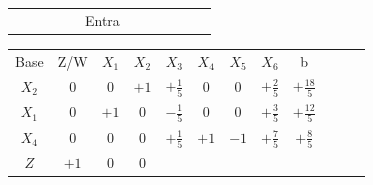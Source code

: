 \documentclass{beamer}
\begin{document}
\begin{frame}
{\begin{table}
\begin{tabular}{c c c c c c c c c c c c}
				& & & & & \scriptsize Entra \\
			\end{tabular}
		\end{table}			
	}	
	{
		\begin{table}		
			\begin{tabular}{c c c c c c c c c c c c}
				\cline{1-8} 
				\cellcolor{blue!100} \color{white} \scriptsize Base 
				&\cellcolor{blue!100} \color{white} \scriptsize Z/W
				&\cellcolor{blue!100} \color{red} $\scriptstyle X_1$ 
				&\cellcolor{blue!100} \color{red} $\scriptstyle X_2$ 
				&\cellcolor{blue!100} \color{white}   $\scriptstyle X_3$ 
				&\cellcolor{blue!100} \color{red} $\scriptstyle X_4$ 
				&\cellcolor{blue!100} \color{white}   $\scriptstyle X_5$ 
				&\cellcolor{blue!100} \color{white}   $\scriptstyle X_6$ 
				&\cellcolor{blue!100} \color{white} \scriptsize b
				&
				&
				& \\
				\cellcolor{blue!100} \color{red} $\scriptstyle X_2$
				& \cellcolor{yellow!50} $\scriptstyle 0$
				& \cellcolor{yellow!50} $\scriptstyle 0$
				& \cellcolor{yellow!50} $\scriptstyle +1$
				& \cellcolor{yellow!50} $\scriptstyle +\frac{1}{5}$
				& \cellcolor{yellow!50} $\scriptstyle 0$
				& \cellcolor{yellow!50} $\scriptstyle 0$
				& \cellcolor{yellow!50} $\scriptstyle +\frac{2}{5}$
				& \cellcolor{yellow!50} $\scriptstyle +\frac{18}{5}$ \\
			    \cellcolor{blue!100} \color{red} $\scriptstyle X_1$
				& \cellcolor{yellow!50} $\scriptstyle 0$
				& \cellcolor{yellow!50} $\scriptstyle +1$
				& \cellcolor{yellow!50} $\scriptstyle 0$
				& \cellcolor{yellow!50} $\scriptstyle -\frac{1}{5}$			
				& \cellcolor{yellow!50} $\scriptstyle 0$
				& \cellcolor{yellow!50} $\scriptstyle 0$
				& \cellcolor{yellow!50} $\scriptstyle +\frac{3}{5}$ 
				& \cellcolor{yellow!50} $\scriptstyle +\frac{12}{5}$ \\
				\cellcolor{blue!100} \color{red} $\scriptstyle X_4$
				& \cellcolor{yellow!50} $\scriptstyle 0$
				& \cellcolor{yellow!50} $\scriptstyle 0$
				& \cellcolor{yellow!50} $\scriptstyle 0$
				& \cellcolor{yellow!50} $\scriptstyle +\frac{1}{5}$
				& \cellcolor{yellow!50} $\scriptstyle +1$
				& \cellcolor{yellow!50} $\scriptstyle -1$
				& \cellcolor{yellow!50} $\scriptstyle +\frac{7}{5}$
				& \cellcolor{yellow!50} $\scriptstyle +\frac{8}{5}$ \\
				\cellcolor{blue!100} \color{white} $\scriptstyle Z$
				& \cellcolor{yellow!50} $\scriptstyle +1$
				& \cellcolor{yellow!50} $\scriptstyle 0$
				& \cellcolor{yellow!50} $\scriptstyle 0$

\end{tabular}
\end{table}}
\end{frame}
\end{document}
